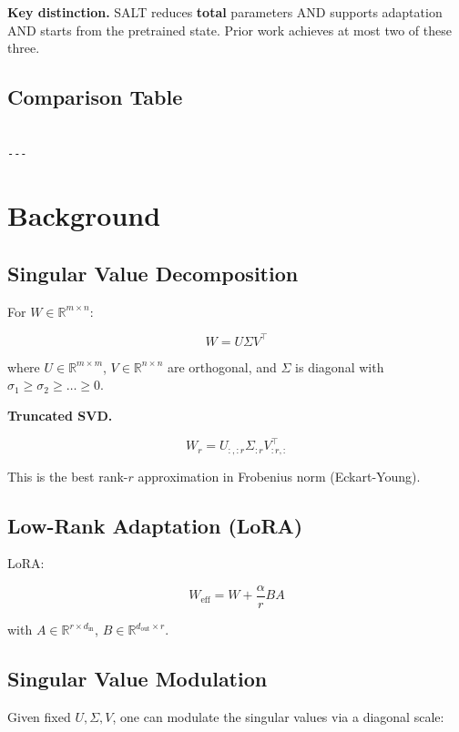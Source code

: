 \textbf{Key distinction.} SALT reduces \textbf{total} parameters AND supports 
adaptation AND starts from the pretrained state. Prior work achieves at most 
two of these three.



\subsection{Comparison Table}

\begin{lstlisting}

---
\end{lstlisting}


\section{Background}

\subsection{Singular Value Decomposition}

For $W \in \mathbb{R}^{m \times n}$:

\[
W = U \Sigma V^\top
\tag{3.1}
\]

where $U \in \mathbb{R}^{m \times m}$, $V \in \mathbb{R}^{n \times n}$ are 
orthogonal, and $\Sigma$ is diagonal with $\sigma_1 \geq \sigma_2 \geq \dots \geq 0$.

\textbf{Truncated SVD.}

\[
W_r = U_{:, :r} \Sigma_{:r} V_{:r, :}^\top
\tag{3.2}
\]

This is the best rank-$r$ approximation in Frobenius norm (Eckart-Young).

\subsection{Low-Rank Adaptation (LoRA)}

LoRA:

\[
W_\text{eff} = W + \frac{\alpha}{r} BA
\tag{3.3}
\]

with $A \in \mathbb{R}^{r \times d_\text{in}}$, $B \in \mathbb{R}^{d_\text{out} \times r}$.

\subsection{Singular Value Modulation}

Given fixed $U, \Sigma, V$, one can modulate the singular values via a 
diagonal scale:

